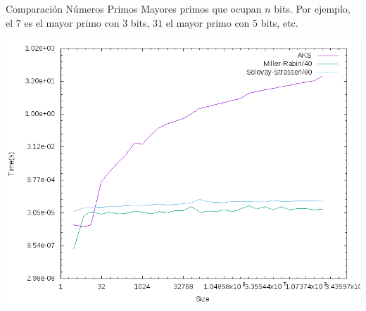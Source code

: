 \documentclass{beamer}
\begin{document}
\begin{frame}{Comparación Números Primos}
	\onslide<1->
	Mayores primos que ocupan $n$ bits. Por ejemplo, el $7$ es el mayor primo con $3$ bits, $31$ el mayor primo con $5$ bits, etc.
	
	\begin{alertblock}{}
		\begin{center}
			\includegraphics[scale=0.40]{../Memoria/img/graphs/aks-probs-primes-mean}
		\end{center}
	\end{alertblock}
\end{frame}
\end{document}
